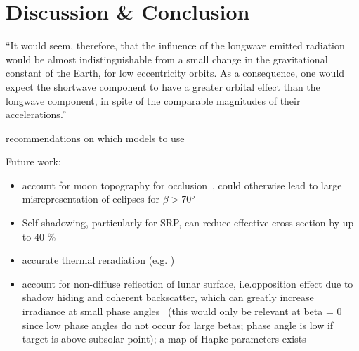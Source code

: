 \section{Discussion \& Conclusion}

\enquote{It would seem, therefore,
that the influence of the longwave emitted radiation would be almost
indistinguishable from a small change in the gravitational constant of the Earth, for
low eccentricity orbits.
As a consequence, one would expect the shortwave
component to have a greater orbital effect than the longwave component, in spite of
the comparable magnitudes of their accelerations.}~\cite{Knocke1989}


recommendations on which models to use


Future work:
\begin{itemize}
    \item account for moon topography for occlusion~\cite{Mazarico2018}, could otherwise lead to large misrepresentation of eclipses for $\beta > \ang{70}$
    \item Self-shadowing, particularly for SRP, can reduce effective cross section by up to 40
    \%~\cite{Mazarico2018}
    \item accurate thermal reradiation (e.g. \cite{Marshall1994})
    \item account for non-diffuse reflection of lunar surface, i.e.opposition effect due to shadow hiding and coherent backscatter, which can greatly increase irradiance at small phase angles~\cite{Buratti1996} (this would only be relevant at beta = 0 since low phase angles do not occur for large betas; phase angle is low if target is above subsolar point); a map of Hapke parameters exists~\cite{Sako2014}
\end{itemize}


